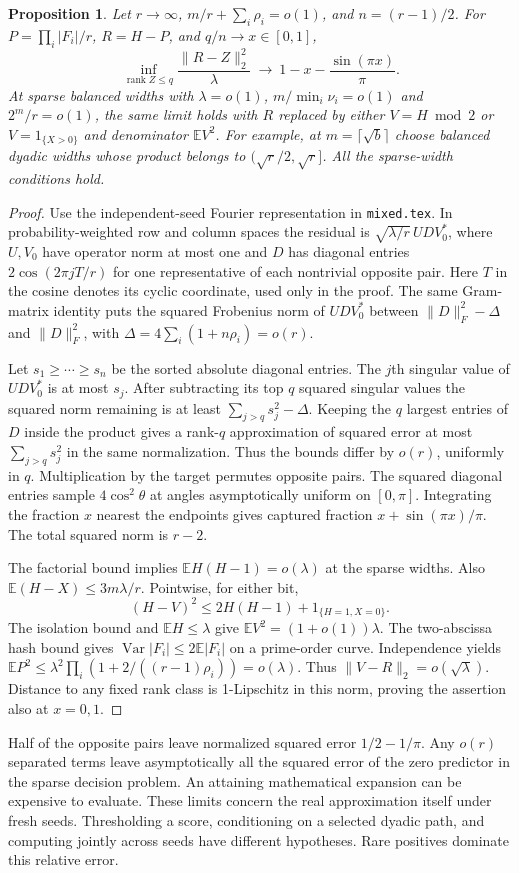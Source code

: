 \documentclass[11pt]{article}
\newtheorem{proposition}{Proposition}
\newcommand{\E}{\mathbb E}
\begin{document}
\begin{proposition}
Let $r\to\infty$, $m/r+\sum_i\rho_i=o(1)$, and $n=(r-1)/2$.
For $P=\prod_i|F_i|/r$, $R=H-P$, and $q/n\to x\in[0,1]$,
\[
 \inf_{\operatorname{rank} Z\le q}\frac{\|R-Z\|_2^2}{\lambda}
 \ \longrightarrow\ 1-x-\frac{\sin(\pi x)}{\pi}.
\]
At sparse balanced widths with $\lambda=o(1)$, $m/\min_i\nu_i=o(1)$
and $2^m/r=o(1)$, the same limit holds with $R$ replaced by either
$V=H\bmod 2$ or $V=1_{\{X>0\}}$ and denominator $\E V^2$.
For example, at $m=\lceil\sqrt b\rceil$ choose balanced dyadic widths
whose product belongs to $(\sqrt r/2,\sqrt r]$. All the sparse-width
conditions hold.
\end{proposition}
\begin{proof}
Use the independent-seed Fourier representation in \texttt{mixed.tex}.
In probability-weighted row and column spaces the residual is
$\sqrt{\lambda/r}\,U D V_0^*$, where $U,V_0$ have operator norm at
most one and $D$ has diagonal entries $2\cos(2\pi jT/r)$ for one
representative of each nontrivial opposite pair. Here $T$ in the
cosine denotes its cyclic coordinate, used only in the proof.
The same Gram-matrix identity puts the squared Frobenius norm of
$U D V_0^*$ between $\|D\|_F^2-\Delta$ and $\|D\|_F^2$, with
$\Delta=4\sum_i(1+n\rho_i)=o(r)$.

Let $s_1\ge\cdots\ge s_n$ be the sorted absolute diagonal entries.
The $j$th singular value of $U D V_0^*$ is at most $s_j$.
After subtracting its top $q$ squared singular values the squared
norm remaining is at least $\sum_{j>q}s_j^2-\Delta$.
Keeping the $q$ largest entries of $D$ inside the product gives a
rank-$q$ approximation of squared error at most $\sum_{j>q}s_j^2$
in the same normalization. Thus the bounds differ by $o(r)$,
uniformly in $q$. Multiplication by the target permutes opposite
pairs. The squared diagonal entries sample $4\cos^2\theta$ at
angles asymptotically uniform on $[0,\pi]$. Integrating the fraction
$x$ nearest the endpoints gives captured fraction
$x+\sin(\pi x)/\pi$. The total squared norm is $r-2$.

The factorial bound implies $\E H(H-1)=o(\lambda)$ at the sparse
widths. Also $\E(H-X)\le3m\lambda/r$. Pointwise, for either bit,
\[
 (H-V)^2\le2H(H-1)+1_{\{H=1,X=0\}} .
\]
The isolation bound and $\E H\le\lambda$ give
$\E V^2=(1+o(1))\lambda$. The two-abscissa hash bound gives
$\operatorname{Var}|F_i|\le2\E|F_i|$ on a prime-order curve.
Independence yields
$\E P^2\le\lambda^2\prod_i(1+2/((r-1)\rho_i))=o(\lambda)$.
Thus $\|V-R\|_2=o(\sqrt{\lambda})$. Distance to any fixed rank class
is 1-Lipschitz in this norm, proving the assertion also at $x=0,1$.
\end{proof}
Half of the opposite pairs leave normalized squared error $1/2-1/\pi$.
Any $o(r)$ separated terms leave asymptotically all the squared error
of the zero predictor in the sparse decision problem. An attaining
mathematical expansion can be expensive to evaluate. These limits
concern the real approximation itself under fresh seeds. Thresholding
a score, conditioning on a selected dyadic path, and computing jointly
across seeds have different hypotheses. Rare positives dominate this
relative error.
\end{document}
